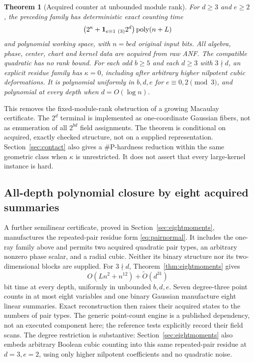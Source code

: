 \documentclass[11pt]{article}
\newtheorem{theorem}{Theorem}[section]\newtheorem{lemma}[theorem]{Lemma}
\theoremstyle{remark}\newtheorem{remark}[theorem]{Remark}
\begin{document}
\begin{theorem}[Acquired counter at unbounded module rank]\label{thm:contact}
For $d\ge3$ and $e\ge2$, the preceding family has deterministic exact
counting time
\[
 \bigl(2^\kappa+\mathbf1_{e\equiv1\ (3)}2^d\bigr)\poly(n+L)
\]
and polynomial working space, with $n=bed$ original input bits.
All algebra, phase, center, chart and kernel data are acquired from raw
ANF. The compatible quadratic has no rank bound.
For each odd $b\ge5$ and each $d\ge3$ with $3\nmid d$, an explicit
residue family has $\kappa=0$, including after arbitrary higher nilpotent
cubic deformations. It is polynomial uniformly in $b,d,e$ for
$e\equiv0,2\pmod3$, and polynomial at every depth when $d=O(\log n)$.
\end{theorem}
This removes the fixed-module-rank obstruction of a growing Macaulay
certificate. The $2^d$ terminal is implemented as one-coordinate Gaussian
fibers, not as enumeration of all $2^{bd}$ field assignments.
The theorem is conditional on acquired, exactly checked structure, not
on a supplied representation. Section~\ref{sec:contact} also gives a
\#P-hardness reduction within the same geometric class when $\kappa$
is unrestricted. It does not assert that every large-kernel instance is hard.

\subsection{All-depth polynomial closure by eight acquired summaries}
A further semilinear certificate, proved in Section~\ref{sec:eightmoments},
manufactures the repeated-pair residue form \eqref{eq:pairnormal}.
It includes the one-ray family above and permits two acquired quadratic
pair types, an arbitrary nonzero phase scalar, and a radial cubic.
Neither its binary structure nor its two-dimensional blocks are supplied.
For $3\nmid d$, Theorem~\ref{thm:eightmoments} gives
\[
 O(Ln^2+n^{12})+\widetilde O(d^{31})
\]
bit time at every depth, uniformly in unbounded $b,d,e$.
Seven degree-three point counts in at most eight variables and one
binary Gaussian manufacture eight linear summaries. Exact reconstruction
then raises their acquired states to the numbers of pair types.
The generic point-count engine is a published dependency, not an executed
component here; the reference tests explicitly record their field scans.
The degree restriction is substantive: Section~\ref{sec:eightmoments}
also embeds arbitrary Boolean cubic counting into this same repeated-pair
residue at $d=3,e=2$, using only higher nilpotent coefficients and no
quadratic noise.
\end{document}
